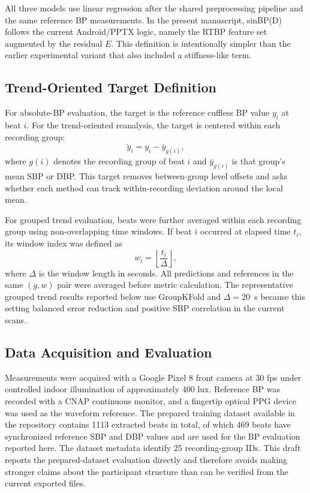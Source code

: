 \documentclass[twocolumn]{svjour3}
\begin{document}
All three models use linear regression after the shared preprocessing pipeline and the same reference BP measurements. In the present manuscript, sinBP(D) follows the current Android/PPTX logic, namely the RTBP feature set augmented by the residual $E$. This definition is intentionally simpler than the earlier experimental variant that also included a stiffness-like term.

\subsection{Trend-Oriented Target Definition}
For absolute-BP evaluation, the target is the reference cuffless BP value $y_i$ at beat $i$. For the trend-oriented reanalysis, the target is centered within each recording group:
\begin{equation}
\tilde{y}_i = y_i - \bar{y}_{g(i)},
\end{equation}
where $g(i)$ denotes the recording group of beat $i$ and $\bar{y}_{g(i)}$ is that group's mean SBP or DBP. This target removes between-group level offsets and asks whether each method can track within-recording deviation around the local mean.

For grouped trend evaluation, beats were further averaged within each recording group using non-overlapping time windows. If beat $i$ occurred at elapsed time $t_i$, its window index was defined as
\begin{equation}
w_i = \left\lfloor \frac{t_i}{\Delta} \right\rfloor ,
\end{equation}
where $\Delta$ is the window length in seconds. All predictions and references in the same $(g,w)$ pair were averaged before metric calculation. The representative grouped trend results reported below use GroupKFold and $\Delta=20$~s because this setting balanced error reduction and positive SBP correlation in the current scans.

\subsection{Data Acquisition and Evaluation}
Measurements were acquired with a Google Pixel 8 front camera at 30 fps under controlled indoor illumination of approximately 400 lux. Reference BP was recorded with a CNAP continuous monitor, and a fingertip optical PPG device was used as the waveform reference. The prepared training dataset available in the repository contains 1113 extracted beats in total, of which 469 beats have synchronized reference SBP and DBP values and are used for the BP evaluation reported here. The dataset metadata identify 25 recording-group IDs. This draft reports the prepared-dataset evaluation directly and therefore avoids making stronger claims about the participant structure than can be verified from the current exported files.
\end{document}

